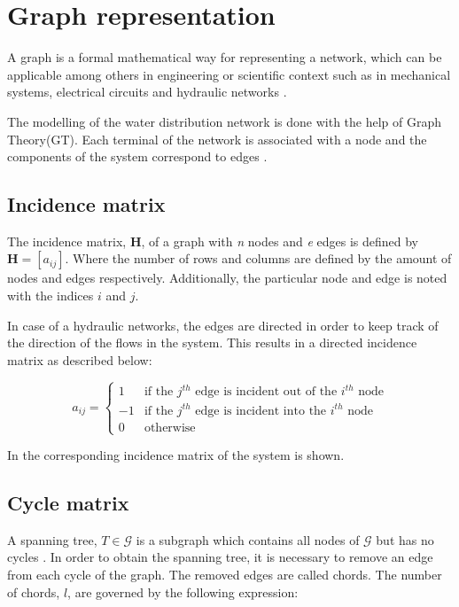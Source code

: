 \section{Graph representation}  
\label{GraphTheory}

A graph is a formal mathematical way for representing a network, which can be applicable among others in engineering or scientific context such as in mechanical systems, electrical circuits and hydraulic networks \cite{graph_intro}. 

The modelling of the water distribution network is done with the help of Graph Theory(GT). Each terminal of the network is associated with a node and the components of the system correspond to edges \cite{GraphTheoryCarsten}. 
\subsection*{Incidence matrix} 
\label{IncidenceSection}
The incidence matrix, $\bm{H}$, of a graph with \textit{n} nodes and \textit{e} edges is 
defined by $\bm{H} = [a_{ij}]$. Where the number of rows and columns are defined by the amount of nodes and edges respectively. 
Additionally, the particular node and edge is noted with the indices $i$ and 
$j$.

In case of a hydraulic networks, the edges are directed in order to keep track of the direction of the flows in the system. This results in a directed incidence matrix as described below:

\begin{equation}
\label{DiGraph}
 a_{ij} =
		\left\{
		\begin{array}{ll}
		
		1 			&      \text{if the $j^{th}$ edge is incident out of the $i^{th}$ node}	
\\
		-1                       &     \text{if the $j^{th}$ edge is incident into the $i^{th}$ node}
\\


                0                       &      \text{otherwise}

		\end{array}
		\right.
\end{equation}	

In  the corresponding incidence matrix of the system is 
shown. 

\subsection*{Cycle matrix}
\label{CycleSection}
A spanning tree, $T \in \mathcal{G}$ is a subgraph which contains all nodes of $\mathcal{G}$ but has no cycles \cite{GraphModel}. 
In order to obtain the spanning tree, it is necessary to remove an edge from each cycle of the graph. The removed edges are called chords. The number of chords, $l$, are governed by the following expression:

